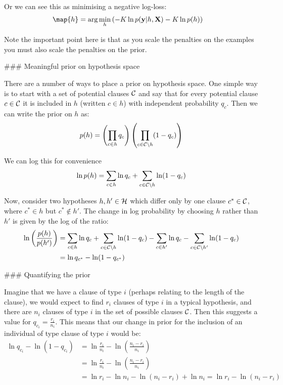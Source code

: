 Or we can see this as minimising a negative log-loss:
\begin{align}
\map{h}
& = \arg\min_{h} \left(-K\ln p(\vec{y}|h, \vec{X}) - K\ln p(h) \right)
\end{align}

Note the important point here is that as you scale the penalties on the examples you must also scale the penalties on the prior.

### Meaningful prior on hypothesis space

There are a number of ways to place a prior on hypothesis space. One simple way is to start with a set of potential clauses $\mathcal{C}$ and say that for every potential clause $c \in \mathcal{C}$ it is included in $h$ (written $c \in h$) with independent probability $q_c$. Then we can write the prior on $h$ as:
\begin{align}
p(h) = \left(\prod_{c \in h} q_c\right)\left(\prod_{c \in \mathcal{C}\setminus h} (1-q_c)\right)
\end{align}

We can log this for convenience
\begin{align}
\ln p(h) = \sum_{c \in h} \ln q_c + \sum_{c \in \mathcal{C}\setminus h} \ln(1-q_c)
\end{align}

Now, consider two hypotheses $h, h' \in \mathcal{H}$ which differ only by one clause $c^*\in\mathcal{C}$, where $c^* \in h$ but $c^* \not\in h'$. The change in log probability by choosing $h$ rather than $h'$ is given by the log of the ratio:
\begin{align}
\ln \left(\frac{p(h)}{p(h')}\right) 
& = \sum_{c \in h} \ln q_c + \sum_{c \in \mathcal{C}\setminus h} \ln(1-q_c)
- \sum_{c \in h'} \ln q_c - \sum_{c \in \mathcal{C}\setminus h'} \ln(1-q_c) \\
& = \ln q_{c^*} 
- \ln(1-q_{c^*}) \\
\end{align}

### Quantifying the prior

Imagine that we have a clause of type $i$ (perhaps relating to the length of the clause), we would expect to find $r_i$ clauses of type $i$ in a typical hypothesis, and there are $n_i$ clauses of type $i$ in the set of possible clauses $\mathcal{C}$. Then this suggests a value for $q_{c_i} = \frac{r_i}{n_i}$. This means that our change in prior for the inclusion of an individual of type clause of type $i$ would be:
\begin{align}
\ln q_{c_i} 
- \ln(1-q_{c_i})
& = \ln \frac{r_i}{n_i} 
- \ln(\frac{n_i - r_i}{n_i}) \\
& = \ln \frac{r_i}{n_i} 
- \ln\left(\frac{n_i - r_i}{n_i}\right) \\
& = \ln r_i - \ln n_i 
- \ln(n_i - r_i) + \ln n_i = \ln r_i - \ln(n_i - r_i)
\end{align}

